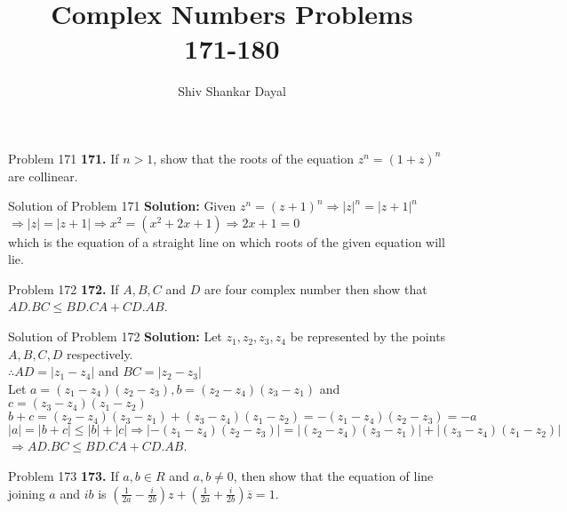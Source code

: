 \documentclass[aspectratio=169,8pt]{beamer}
\title{Complex Numbers Problems\\ 171-180}
\author[Shiv Shankar Dayal]{Shiv Shankar Dayal}
\begin{document}
\begin{frame}
  \titlepage
\end{frame}
\begin{frame}{Problem 171}
  \textbf{171.} If $n > 1$, show that the roots of the equation $z^n = (1 + z)^n$ are collinear.
\end{frame}
\begin{frame}{Solution of Problem 171}
  \textbf{Solution:} Given $z^n = (z + 1)^n \Rightarrow |z|^n = |z + 1|^n$\\
  \vspace*{0.2cm}
  $\Rightarrow |z| = |z + 1|\Rightarrow x^2 = (x^2 + 2x + 1) \Rightarrow 2x + 1 = 0$\\
  \vspace*{0.2cm}
  which is the equation of a straight line on which roots of the given equation will lie.
\end{frame}
\begin{frame}{Problem 172}
  \textbf{172.} If $A,B,C$ and $D$ are four complex number then show that $AD.BC\leq BD.CA + CD.AB$.
\end{frame}
\begin{frame}{Solution of Problem 172}
  \textbf{Solution:} Let $z_1, z_2, z_3, z_4$ be represented by the points $A, B, C, D$ respectively.\\
  \vspace*{0.2cm}
  $\therefore AD = |z_1 - z_4|$ and $BC = |z_2 - z_3|$\\
  \vspace*{0.2cm}
  Let $a = (z_1 - z_4)(z_2 - z_3), b = (z_2 - z_4)(z_3 - z_1)$ and $c = (z_3 - z_4)(z_1 - z_2)$\\
  \vspace*{0.2cm}
  $b + c = (z_2 - z_4)(z_3 - z_1) + (z_3 - z_4)(z_1 - z_2) = -(z_1 - z_4)(z_2 - z_3) = -a$\\
  \vspace*{0.2cm}
  $|a| = |b + c| \leq |b| + |c| \Rightarrow |-(z_1 - z_4)(z_2 - z_3)| = |(z_2 - z_4)(z_3 - z_1)| + |(z_3 - z_4)(z_1 - z_2)|$\\
  \vspace*{0.2cm}
  $\Rightarrow AD.BC\leq BD.CA + CD.AB$.
\end{frame}
\begin{frame}{Problem 173}
  \textbf{173.} If $a, b\in R$ and $a, b\neq 0$, then show that the equation of line joining $a$ and $ib$ is $\left(\frac{1}{2a} -
  \frac{i}{2b}\right)z + \left(\frac{1}{2a} + \frac{i}{2b}\right)\overline{z} = 1$.
\end{frame}
\end{document}
